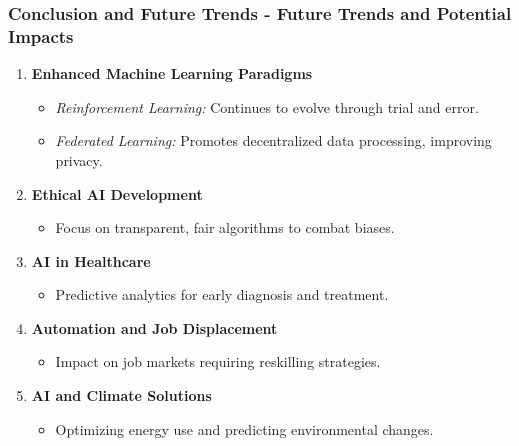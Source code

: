 \documentclass[aspectratio=169]{beamer}
\begin{document}
\begin{frame}[fragile]
    \frametitle{Conclusion and Future Trends - Future Trends and Potential Impacts}
    \begin{enumerate}
        \item \textbf{Enhanced Machine Learning Paradigms}
        \begin{itemize}
            \item \textit{Reinforcement Learning:} Continues to evolve through trial and error.
            \item \textit{Federated Learning:} Promotes decentralized data processing, improving privacy.
        \end{itemize}
        
        \item \textbf{Ethical AI Development}
        \begin{itemize}
            \item Focus on transparent, fair algorithms to combat biases.
        \end{itemize}
        
        \item \textbf{AI in Healthcare}
        \begin{itemize}
            \item Predictive analytics for early diagnosis and treatment.
        \end{itemize}
        
        \item \textbf{Automation and Job Displacement}
        \begin{itemize}
            \item Impact on job markets requiring reskilling strategies.
        \end{itemize}
        
        \item \textbf{AI and Climate Solutions}
        \begin{itemize}
            \item Optimizing energy use and predicting environmental changes.
        \end{itemize}
    \end{enumerate}
\end{frame}
\end{document}
